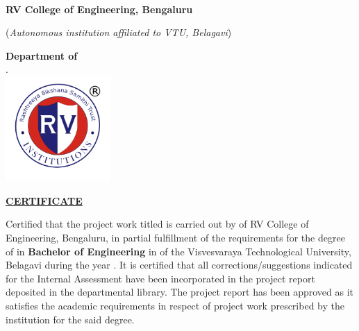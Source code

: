 \thispagestyle{empty}
\vspace{-1cm}
\begin{center}
\Large\textbf{RV College of Engineering\textsuperscript{\small\textregistered}, Bengaluru} \par
\large{(\textit{Autonomous institution affiliated to VTU, Belagavi})} \par
\large\textbf{Department of \printDepartmentLF}\\
.\hspace{2cm}\\
\includegraphics[width=4cm]{Figures/RV_logoVec}\par
\Large\textbf{\underline{CERTIFICATE}} \par
\end{center}
\begin{spacing}{1.5}
\noindent Certified that the \fi project work titled \textbf{\textit{\printTitle}} is carried out by
\fi
of RV College of Engineering, Bengaluru, in partial fulfillment of the requirements for the degree of  \ifPG \textbf{\printMastersInLF} in \textbf{\printMastersPrgName} \else\textbf{Bachelor of Engineering} in \textbf{\printDepartmentLF} \fi of the Visvesvaraya Technological University, Belagavi during the year \printAcadYear. It is certified that all corrections/suggestions indicated for the Internal Assessment have been incorporated in the \fi project report deposited in the departmental library. The \fi project report has been approved as it satisfies the academic requirements in respect of \fi project work prescribed by the institution for the said degree.\\ \par
\end{spacing}

